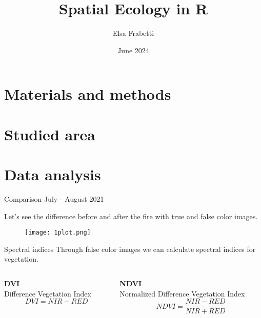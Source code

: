 \documentclass{beamer}
\title{Spatial Ecology in R}
\author{Elsa Frabetti}
\institute{Global change ecology - Unibo}
\date{June 2024}
\begin{document}
\maketitle
{} %


\section{Materials and methods}

\section{Studied area}

\section{Data analysis}

\begin{frame}{Comparison July - August 2021}

\centering
Let's see the difference before and after the fire with true and false color images. 
\begin{figure}
    \centering
    \texttt{[image: 1plot.png]}
\end{figure}
\end{frame}

\begin{frame}{Spectral indices}
\centering %
Through false color images we can calculate spectral indices for vegetation.
\bigskip %
\bigskip
\begin{columns}
    \begin{column}[t]{0.55\textwidth}
    \centering
    \textbf{DVI}\\ \small Difference Vegetation Index
    \begin{equation*}
        DVI = NIR - RED
    \end{equation*}
    \end{column}

    \begin{column}[t]{0.6\textwidth}
    \centering
    \textbf{NDVI}\\ \small Normalized Difference Vegetation Index
    \begin{equation*}
        NDVI = \frac{NIR - RED}{NIR + RED}
    \end{equation*}
    \end{column}   
\end{columns}    
\end{frame}
\end{document}
